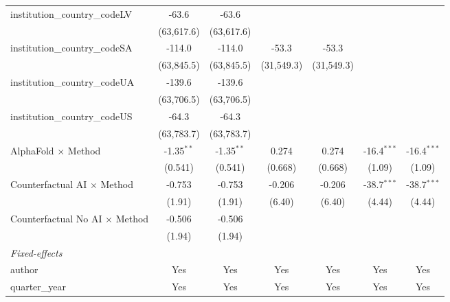 \begin{tabular}{lcccccc}
   institution\_country\_codeLV          & -63.6        & -63.6        &             &             &                &   \\   
                                         & (63,617.6)   & (63,617.6)   &             &             &                &   \\   
   institution\_country\_codeSA          & -114.0       & -114.0       & -53.3       & -53.3       &                &   \\   
                                         & (63,845.5)   & (63,845.5)   & (31,549.3)  & (31,549.3)  &                &   \\   
   institution\_country\_codeUA          & -139.6       & -139.6       &             &             &                &   \\   
                                         & (63,706.5)   & (63,706.5)   &             &             &                &   \\   
   institution\_country\_codeUS          & -64.3        & -64.3        &             &             &                &   \\   
                                         & (63,783.7)   & (63,783.7)   &             &             &                &   \\   
   AlphaFold $\times$ Method             & -1.35$^{**}$ & -1.35$^{**}$ & 0.274       & 0.274       & -16.4$^{***}$  & -16.4$^{***}$\\   
                                         & (0.541)      & (0.541)      & (0.668)     & (0.668)     & (1.09)         & (1.09)\\   
   Counterfactual AI $\times$ Method     & -0.753       & -0.753       & -0.206      & -0.206      & -38.7$^{***}$  & -38.7$^{***}$\\   
                                         & (1.91)       & (1.91)       & (6.40)      & (6.40)      & (4.44)         & (4.44)\\   
   Counterfactual No AI $\times$ Method  & -0.506       & -0.506       &             &             &                &   \\   
                                         & (1.94)       & (1.94)       &             &             &                &   \\   
   \midrule
   \emph{Fixed-effects}\\
   author                                & Yes          & Yes          & Yes         & Yes         & Yes            & Yes\\  
   quarter\_year                         & Yes          & Yes          & Yes         & Yes         & Yes            & Yes\\  

\end{tabular}
